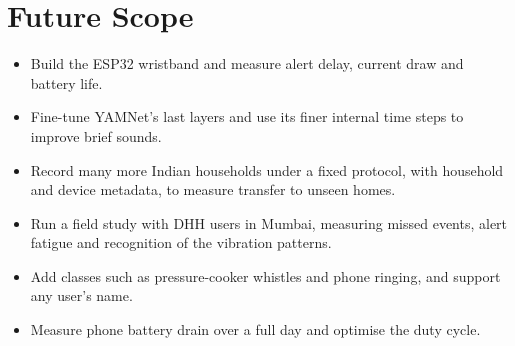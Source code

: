 \documentclass[12pt,a4paper,oneside]{report}
\begin{document}
\section{Future Scope}
\begin{itemize}[itemsep=2pt]
\item Build the ESP32 wristband and measure alert delay, current draw and battery life.
\item Fine-tune YAMNet's last layers and use its finer internal time steps to improve brief sounds.
\item Record many more Indian households under a fixed protocol, with household and device metadata, to measure transfer to unseen homes.
\item Run a field study with DHH users in Mumbai, measuring missed events, alert fatigue and recognition of the vibration patterns.
\item Add classes such as pressure-cooker whistles and phone ringing, and support any user's name.
\item Measure phone battery drain over a full day and optimise the duty cycle.
\end{itemize}
\end{document}
